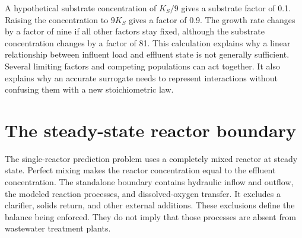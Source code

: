 A hypothetical substrate concentration of $K_S/9$ gives a substrate factor of 0.1. Raising the concentration to $9K_S$ gives a factor of 0.9. The growth rate changes by a factor of nine if all other factors stay fixed, although the substrate concentration changes by a factor of 81. This calculation explains why a linear relationship between influent load and effluent state is not generally sufficient. Several limiting factors and competing populations can act together. It also explains why an accurate surrogate needs to represent interactions without confusing them with a new stoichiometric law.

\section{The steady-state reactor boundary}

The single-reactor prediction problem uses a completely mixed reactor at steady state. Perfect mixing makes the reactor concentration equal to the effluent concentration. The standalone boundary contains hydraulic inflow and outflow, the modeled reaction processes, and dissolved-oxygen transfer. It excludes a clarifier, solids return, and other external additions. These exclusions define the balance being enforced. They do not imply that those processes are absent from wastewater treatment plants.

